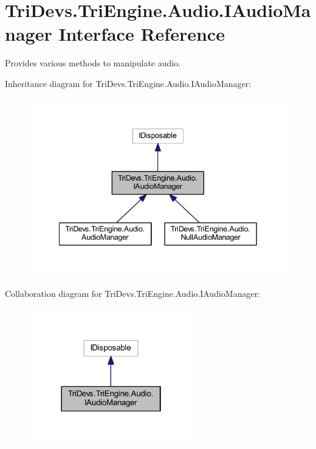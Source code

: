 \hypertarget{interface_tri_devs_1_1_tri_engine_1_1_audio_1_1_i_audio_manager}{\section{Tri\-Devs.\-Tri\-Engine.\-Audio.\-I\-Audio\-Manager Interface Reference}
\label{interface_tri_devs_1_1_tri_engine_1_1_audio_1_1_i_audio_manager}
}


Provides various methods to manipulate audio.  




Inheritance diagram for Tri\-Devs.\-Tri\-Engine.\-Audio.\-I\-Audio\-Manager\-:
\nopagebreak
\begin{figure}[H]
\begin{center}
\leavevmode
\includegraphics[width=342pt]{interface_tri_devs_1_1_tri_engine_1_1_audio_1_1_i_audio_manager__inherit__graph}
\end{center}
\end{figure}


Collaboration diagram for Tri\-Devs.\-Tri\-Engine.\-Audio.\-I\-Audio\-Manager\-:
\nopagebreak
\begin{figure}[H]
\begin{center}
\leavevmode
\includegraphics[width=202pt]{interface_tri_devs_1_1_tri_engine_1_1_audio_1_1_i_audio_manager__coll__graph}
\end{center}
\end{figure}
